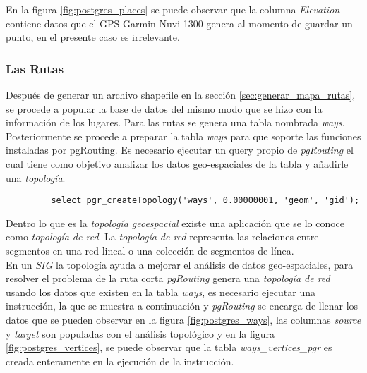        En la figura \ref{fig:postgres_places} se puede observar que la columna \emph{Elevation} contiene datos que el GPS Garmin Nuvi 1300 genera al momento de guardar un punto, en el presente caso es irrelevante.\\

       \subsubsection{Las Rutas}
       \label{subs:Las Rutas}

       Después de generar un archivo shapefile en la sección \ref{sec:generar_mapa_rutas}, se procede a popular la base de datos del mismo modo que se hizo con la información de los lugares. Para las rutas se genera una tabla nombrada \emph{ways}.\\

       Posteriormente se procede a preparar la tabla \emph{ways} para que soporte las funciones instaladas por pgRouting.
       Es necesario ejecutar un query propio de \emph{pgRouting} el cual tiene como objetivo analizar los datos geo-espaciales de la tabla y añadirle una \emph{topología}.\\

       \begin{verbatim}
         select pgr_createTopology('ways', 0.00000001, 'geom', 'gid');
       \end{verbatim}

       Dentro lo que es la \emph{topología geoespacial} existe una aplicación que se lo conoce como \emph{topología de red}. La \emph{topología de red} representa las relaciones entre segmentos en una red lineal o una colección de segmentos de línea. \cite{osgeo_journal_topology} \\

       En un \emph{SIG} la topología ayuda a mejorar el análisis de datos geo-espaciales, para resolver el problema de la ruta corta \emph{pgRouting} genera una \emph{topología de red} usando los datos que existen en la tabla \emph{ways}, es necesario ejecutar una instrucción, la que se muestra a continuación y \emph{pgRouting} se encarga de llenar los datos que se pueden observar en la figura \ref{fig:postgres_ways}, las columnas \emph{source} y \emph{target} son populadas con el análisis topológico y en la figura \ref{fig:postgres_vertices}, se puede observar que la tabla \emph{ways\_vertices\_pgr} es creada enteramente en la ejecución de la instrucción.\\

